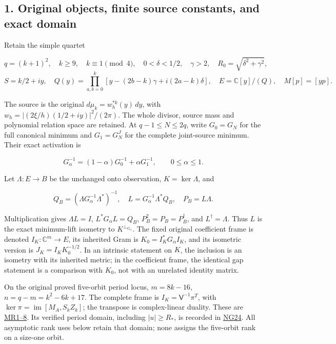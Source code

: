 \documentclass[11pt]{article}
\begin{document}
\subsection{1. Original objects, finite source constants, and exact domain}\label{original-objects-finite-source-constants-and-exact-domain}

Retain the simple quartet

\[
q=(k+1)^2,\quad k\ge9,\quad k\equiv1\pmod4,\quad
0<\delta<1/2,\quad\gamma>2,\quad R_0=\sqrt{\delta^2+\gamma^2},
\] \[
S=k/2+iy,\quad Q(y)=\prod_{a,b=0}^k[y-(2b-k)\gamma+i(2a-k)\delta],
\quad E=\mathbb C[y]/(Q),\quad M[p]=[yp].
\tag{KG1}
\]

The source is the original \(d\mu_k=w_h^{*k}(y)\,dy\), with \(w_h=|(2\xi/h)(1/2+iy)|^2/(2\pi)\). The whole divisor, source mass and polynomial relation space are retained. At \(q-1\le N\le2q\), write \(G_0=G_N\) for the full canonical minimum and \(G_1=G_N^J\) for the complete joint-source minimum. Their exact activation is

\[
G_\alpha^{-1}=(1-\alpha)G_0^{-1}+\alpha G_1^{-1},\qquad0\le\alpha\le1.
\tag{KG2}
\]

Let \(\Lambda:E\to B\) be the unchanged onto observation, \(K=\ker\Lambda\), and

\[
Q_B=(\Lambda G_\alpha^{-1}\Lambda^*)^{-1},\quad
L=G_\alpha^{-1}\Lambda^*Q_B,\quad P_B=L\Lambda.
\tag{KG3}
\]

Multiplication gives \(\Lambda L=I\), \(L^*G_\alpha L=Q_B\), \(P_B^2=P_B=P_B^\dagger\), and \(L^\dagger=\Lambda\). Thus \(L\) is the exact minimum-lift isometry to \(K^{\perp_{G_\alpha}}\). The fixed original coefficient frame is denoted \(I_K:\mathbb C^m\to E\), its inherited Gram is \(K_0=I_K^*G_\alpha I_K\), and its isometric version is \(J_K=I_KK_0^{-1/2}\). In an intrinsic statement on \(K\), the inclusion is an isometry with its inherited metric; in the coefficient frame, the identical gap statement is a comparison with \(K_0\), not with an unrelated identity matrix.

On the original proved five-orbit period locus, \(m=8k-16\), \(n=q-m=k^2-6k+17\). The complete frame is \(I_K=\mathsf V^{-1}\pi^T\), with \(\ker\pi=\operatorname{im}[M_A,S_kZ_k]\); the transpose is complex-linear duality. These are \href{https://github.com/KokunoYumeto/zeta-function-research-reader/blob/5992ad50c0f2a06921f1fcaded7b4e38097c0739/workbenches/splitzero-tandem/continuations/20260920-original-kernel-mixed-determinants/ORIGINAL_KERNEL_MIXED_DETERMINANT.tex\#L30}{MR1--8}. Its verified period domain, including \(|u|\ge R_*\), is recorded in \href{https://github.com/KokunoYumeto/zeta-function-research-reader/blob/5992ad50c0f2a06921f1fcaded7b4e38097c0739/workbenches/splitzero-tandem/continuations/20260920-original-kernel-mixed-determinants/providers/NATIVE_GAUSSIAN_TRANSFER.tex\#L482}{NG24}. All asymptotic rank uses below retain that domain; none assigns the five-orbit rank on a size-one orbit.
\end{document}
